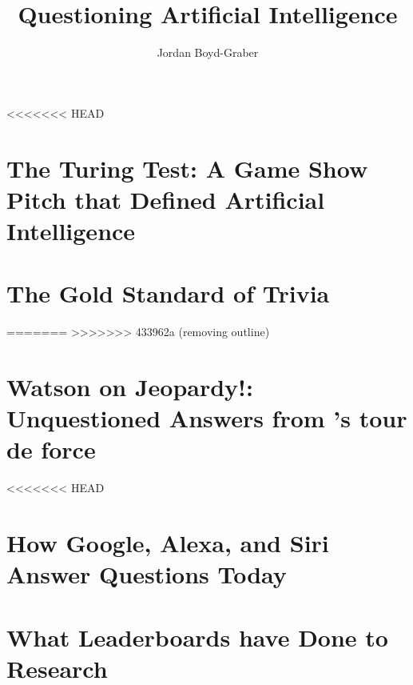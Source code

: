 \documentclass[bfivepaper,twosided,justified,nobib]{tufte-book}
\title{Questioning Artificial Intelligence}
\author{Jordan Boyd-Graber}
\newcommand{\chapterfile}[2]{\chapter{#2}
  \label{ch:#1}
  }
\begin{document}
\setcounter{secnumdepth}{0}














\clearpage





<<<<<<< HEAD

\chapterfile{turing}{The Turing Test: A Game Show Pitch that Defined Artificial Intelligence}

\chapterfile{qb}{The Gold Standard of Trivia}
=======
>>>>>>> 433962a (removing outline)

\chapterfile{watson}{Watson on Jeopardy!: \\ Unquestioned Answers from
\abr{ibm}'s tour de force}

<<<<<<< HEAD
\chapterfile{modern-qa}{How Google, Alexa, and Siri Answer Questions Today}



\chapterfile{leaderboard}{What Leaderboards have Done to \abr{ai} Research}





\end{document}
